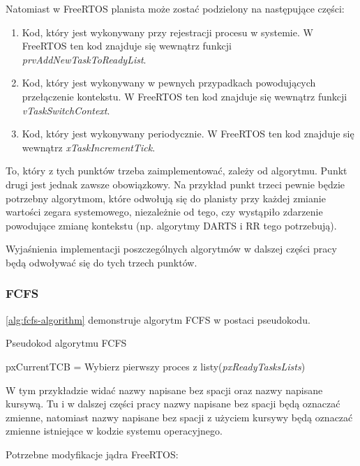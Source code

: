 \documentclass[../../main]{subfiles}
\begin{document}
Natomiast w FreeRTOS planista może zostać podzielony na następujące części:

\begin{enumerate}
    \item Kod, który jest wykonywany przy rejestracji procesu w systemie. W FreeRTOS ten kod znajduje się wewnątrz funkcji \textit{prvAddNewTaskToReadyList}.
    \item Kod, który jest wykonywany w pewnych przypadkach powodujących przełączenie kontekstu. W FreeRTOS ten kod znajduje się wewnątrz funkcji \textit{vTaskSwitchContext}.
    \item Kod, który jest wykonywany periodycznie. W FreeRTOS ten kod znajduje się wewnątrz \textit{xTaskIncrementTick}.
\end{enumerate}

To, który z tych punktów trzeba zaimplementować, zależy od algorytmu. Punkt drugi jest jednak zawsze obowiązkowy. Na przykład punkt trzeci pewnie będzie potrzebny algorytmom, które odwołują się do planisty przy każdej zmianie wartości zegara systemowego, niezależnie od tego, czy wystąpiło zdarzenie powodujące zmianę kontekstu (np. algorytmy DARTS i RR tego potrzebują).

Wyjaśnienia implementacji poszczególnych algorytmów w dalszej części pracy będą odwoływać się do tych trzech punktów.

\subsubsection{FCFS}

\cref{alg:fcfs-algorithm} demonstruje algorytm FCFS w postaci pseudokodu. 

\begin{algorithm}[ht]
\caption{Pseudokod algorytmu FCFS}\label{alg:fcfs-algorithm}
\begin{algorithmic}[1]
\State pxCurrentTCB = Wybierz pierwszy proces z listy(\textit{pxReadyTasksLists})
\end{algorithmic}
\end{algorithm}

W tym przykładzie widać nazwy napisane bez spacji oraz nazwy napisane kursywą. Tu i w dalszej części pracy nazwy napisane bez spacji będą oznaczać zmienne, natomiast nazwy napisane bez spacji z użyciem kursywy będą oznaczać zmienne istniejące w kodzie systemu operacyjnego.

Potrzebne modyfikacje jądra FreeRTOS:
\end{document}
